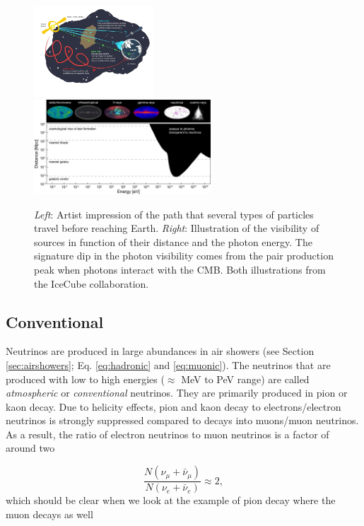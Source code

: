 \begin{figure}[t]
\centering
\includegraphics[width=0.4\textwidth]{chapter3/img/sourceinformation_3.jpg}
\includegraphics[width=0.59\textwidth]{chapter3/img/opaque-to-photons.png}
\caption{\textit{Left}: Artist impression of the path that several types of particles travel before reaching Earth. \textit{Right}: Illustration of the visibility of sources in function of their distance and the photon energy. The signature dip in the photon visibility comes from the pair production peak when photons interact with the CMB. Both illustrations from the IceCube collaboration.}
\label{fig:sourceinfo}
\end{figure}


\subsection{Conventional}
Neutrinos are produced in large abundances in air showers (see Section \ref{sec:airshowers}; Eq. \ref{eq:hadronic} and \ref{eq:muonic}). The neutrinos that are produced with low to high energies ($\approx$ MeV to PeV range) are called \textit{atmospheric} or \textit{conventional} neutrinos. They are primarily produced in pion or kaon decay. Due to helicity effects, pion and kaon decay to electrons/electron neutrinos is strongly suppressed compared to decays into muons/muon neutrinos. As a result, the ratio of electron neutrinos to muon neutrinos is a factor of around two

\begin{equation}
\frac{N\left( \nu_\mu + \bar{\nu}_\mu\right) }{N\left(\nu_e + \bar{\nu}_e\right)} \approx 2,
\end{equation}
which should be clear when we look at the example of pion decay where the muon decays as well

